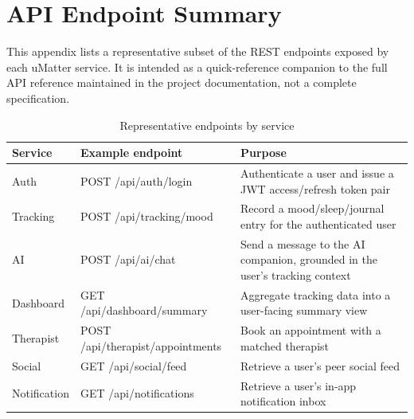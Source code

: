 \appendix

\chapter{API Endpoint Summary}
\label{Appendix1}

This appendix lists a representative subset of the REST endpoints exposed by each uMatter service. It is intended as a quick-reference companion to the full API reference maintained in the project documentation, not a complete specification.

\begin{table}[ht]
\centering
\small
\caption{Representative endpoints by service}
\label{tab:api-summary}
\begin{tabular}{ |L{2.8cm}|L{5.0cm}|L{5.8cm}| }
 \hline
 \textbf{Service} & \textbf{Example endpoint} & \textbf{Purpose} \\
 \hline
 Auth & POST /api/auth/login & Authenticate a user and issue a JWT access/refresh token pair \\
 \hline
 Tracking & POST /api/tracking/mood & Record a mood/sleep/journal entry for the authenticated user \\
 \hline
 AI & POST /api/ai/chat & Send a message to the AI companion, grounded in the user's tracking context \\
 \hline
 Dashboard & GET /api/dashboard/\newline summary & Aggregate tracking data into a user-facing summary view \\
 \hline
 Therapist & POST /api/therapist/\newline appointments & Book an appointment with a matched therapist \\
 \hline
 Social & GET /api/social/feed & Retrieve a user's peer social feed \\
 \hline
 Notification & GET /api/notifications & Retrieve a user's in-app notification inbox \\
 \hline
\end{tabular}
\end{table}
